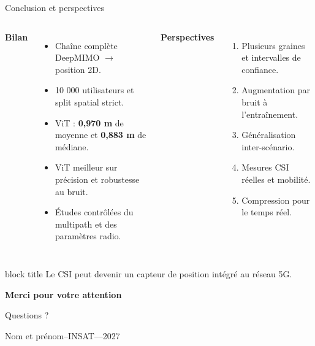 \documentclass[aspectratio=169,10pt]{beamer}
\newcommand{\Auteur}{Nom et prénom}
\newcommand{\Etablissement}{INSAT}
\newcommand{\best}[1]{\textbf{\color{darkgreen}#1}}
\begin{document}
\begin{frame}{Conclusion et perspectives}
  \begin{columns}[T,onlytextwidth]
      \textbf{Bilan}
      \begin{itemize}
        \item Chaîne complète DeepMIMO $\rightarrow$ position 2D.
        \item 10 000 utilisateurs et split spatial strict.
        \item ViT : \best{0,970 m} de moyenne et \best{0,883 m} de médiane.
        \item ViT meilleur sur précision et robustesse au bruit.
        \item Études contrôlées du multipath et des paramètres radio.
      \end{itemize}

      \textbf{Perspectives}
      \begin{enumerate}
        \item Plusieurs graines et intervalles de confiance.
        \item Augmentation par bruit à l'entraînement.
        \item Généralisation inter-scénario.
        \item Mesures CSI réelles et mobilité.
        \item Compression pour le temps réel.
      \end{enumerate}
  \end{columns}
  \vspace{0.35cm}
  \begin{beamercolorbox}[rounded=true,sep=0.9em,center]{block title}
    \Large Le CSI peut devenir un capteur de position intégré au réseau 5G.
  \end{beamercolorbox}
\end{frame}

\begin{frame}[plain]
  \begin{center}
    \vspace{1.2cm}
    {\Huge\bfseries\color{insatblue} Merci pour votre attention}\par
    \vspace{0.7cm}
    {\LARGE Questions ?}\par
    \vspace{1.0cm}
    \vfill
    {\large \Auteur\quad--\quad\Etablissement\quad----2027}
  \end{center}
\end{frame}
\end{document}
